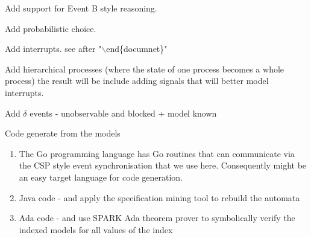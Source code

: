 \documentclass[]{article}
\begin{document}
\begin{enumerate}

{\bf
\item Add support for Event B style reasoning.
\item Add probabilistic choice.


\item Add interrupts.  see after "$\backslash$end\{documnet\}"
\item Add hierarchical processes (where the state of one process becomes a whole process)
 the result will be  include adding signals that will  better model interrupts.
\item Add $\delta$ events - unobservable and blocked + model known
\item Code generate from the models

\begin{enumerate}
\item The Go programming language has Go routines that can communicate via  the CSP style event synchronisation that we use here. Consequently might be an easy target language for code  generation.

\item Java code -  and apply the specification mining tool to rebuild the automata
\item Ada code -  and use SPARK Ada theorem prover to symbolically  verify the indexed models for all values of the index
\end{enumerate}
}
\end{enumerate}



\newpage
\end{document}
